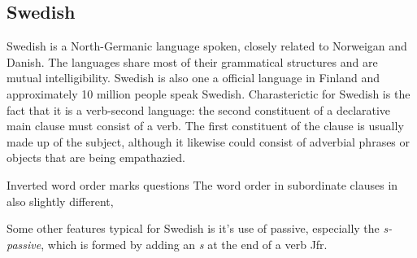 \documentclass{report}
\begin{document}
\subsection{Swedish}
Swedish is a North-Germanic language spoken,
closely related to Norweigan and Danish. The languages share most of their
grammatical structures and are mutual intelligibility. Swedish is also one
a official language in Finland and approximately 10 million people speak Swedish.
Charasterictic for Swedish is the fact that it is a verb-second language: the
second constituent of a declarative main clause must consist of a verb.
The first constituent of the clause is usually made up of the subject,
although it likewise could consist of adverbial phrases or objects that are
being empathazied. \\


Inverted word order marks questions
The word order in subordinate clauses in also slightly different,

Some other features typical for Swedish is it's use of passive, especially the
\textit{s-passive}, which is formed by adding an \emph{s} at the end of a verb
Jfr.
\end{document}
